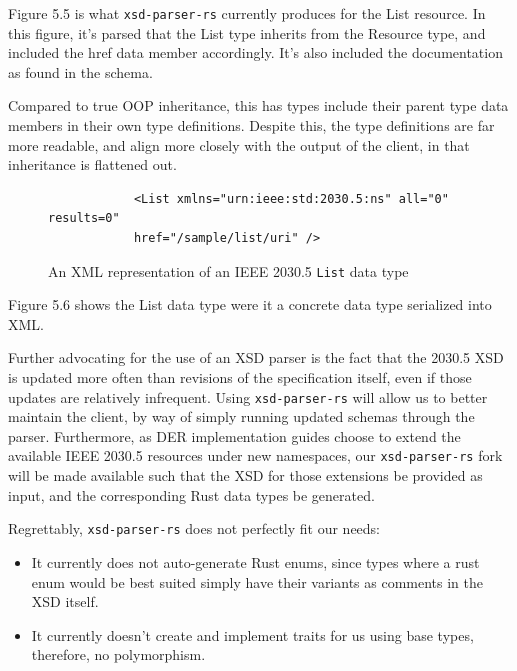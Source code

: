 Figure 5.5 is what \texttt{xsd-parser-rs} currently produces for the List resource. In this figure, it's parsed that the List type inherits from the Resource type, and included the href data member accordingly. It's also included the documentation as found in the schema.

Compared to true OOP inheritance, this has types include their parent type data members in their own type definitions.
Despite this, the type definitions are far more readable, and align more closely with the output of the client, in that inheritance is flattened out.


\begin{figure}[H]
    \begin{center}
        \begin{lstlisting}
            <List xmlns="urn:ieee:std:2030.5:ns" all="0" results=0" 
            href="/sample/list/uri" />
        \end{lstlisting}
        \label{fig:listxml}
        \caption{An XML representation of an IEEE 2030.5 \texttt{List} data type}
    \end{center}
\end{figure}

Figure 5.6 shows the List data type were it a concrete data type serialized into XML.

Further advocating for the use of an XSD parser is the fact that the 2030.5 XSD is updated more often than revisions of the specification itself, even if those updates are relatively infrequent.
Using \texttt{xsd-parser-rs} will allow us to better maintain the client, by way of simply running updated schemas through the parser.
Furthermore, as DER implementation guides choose to extend the available IEEE 2030.5 resources under new namespaces, 
our \texttt{xsd-parser-rs} fork will be made available such that the XSD for those extensions be provided as input, and the corresponding Rust data types be generated.

Regrettably, \texttt{xsd-parser-rs} does not perfectly fit our needs:
\begin{itemize}
    \item It currently does not auto-generate Rust enums, since types where a rust enum would be best suited simply have their variants as comments in the XSD itself.
    \item It currently doesn't create and implement traits for us using base types, therefore, no polymorphism.
\end{itemize}

